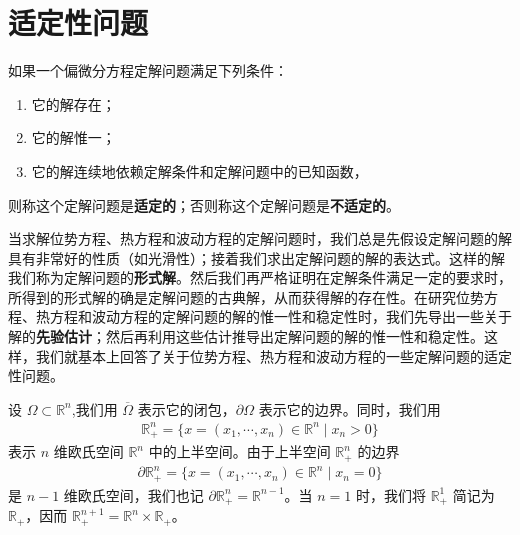 \documentclass[../../main.tex]{subfiles}%
\begin{document}
\section{适定性问题}

\begin{definition}
如果一个偏微分方程定解问题满足下列条件：
\begin{enumerate}[(1)]
\item 它的解存在；
\item 它的解惟一；
\item 它的解连续地依赖定解条件和定解问题中的已知函数，
\end{enumerate}
则称这个定解问题是\textbf{适定的}；否则称这个定解问题是\textbf{不适定的}。
\end{definition}

当求解位势方程、热方程和波动方程的定解问题时，我们总是先假设定解问题的解具有非常好的性质（如光滑性）；接着我们求出定解问题的解的表达式。这样的解我们称为定解问题的\textbf{形式解}。然后我们再严格证明在定解条件满足一定的要求时，所得到的形式解的确是定解问题的古典解，从而获得解的存在性。在研究位势方程、热方程和波动方程的定解问题的解的惟一性和稳定性时，我们先导出一些关于解的\textbf{先验估计}；然后再利用这些估计推导出定解问题的解的惟一性和稳定性。这样，我们就基本上回答了关于位势方程、热方程和波动方程的一些定解问题的适定性问题。

\begin{definition}
设 $\Omega\subset \mathbb{R}^n$,我们用 $\overline{\Omega}$ 表示它的闭包，$\partial\Omega$ 表示它的边界。同时，我们用
\begin{align*}
\mathbb{R}_+^n = \{x=(x_1,\cdots,x_n)\in\mathbb{R}^n \mid x_n > 0\}
\end{align*}
表示 $n$ 维欧氏空间 $\mathbb{R}^n$ 中的上半空间。由于上半空间 $\mathbb{R}_+^n$ 的边界
\begin{align*}
\partial\mathbb{R}_+^n = \{x=(x_1,\cdots,x_n)\in\mathbb{R}^n \mid x_n=0\}
\end{align*}
是 $n-1$ 维欧氏空间，我们也记 $\partial\mathbb{R}_+^n = \mathbb{R}^{n-1}$。当 $n=1$ 时，我们将 $\mathbb{R}_+^1$ 简记为 $\mathbb{R}_+$，因而 $\mathbb{R}_+^{n+1} = \mathbb{R}^n \times \mathbb{R}_+$。
\end{definition}
\end{document}
